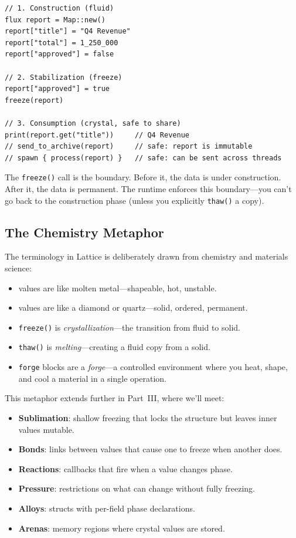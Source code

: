 \begin{lstlisting}[language=Lattice, caption={The lifecycle of data in Lattice}]
// 1. Construction (fluid)
flux report = Map::new()
report["title"] = "Q4 Revenue"
report["total"] = 1_250_000
report["approved"] = false

// 2. Stabilization (freeze)
report["approved"] = true
freeze(report)

// 3. Consumption (crystal, safe to share)
print(report.get("title"))     // Q4 Revenue
// send_to_archive(report)     // safe: report is immutable
// spawn { process(report) }   // safe: can be sent across threads
\end{lstlisting}

The \lstinline|freeze()| call is the boundary.
Before it, the data is under construction.
After it, the data is permanent.
The runtime enforces this boundary---you can't go back to the construction phase (unless you explicitly \lstinline|thaw()| a copy).

\subsection{The Chemistry Metaphor}\label{subsec:chemistry-metaphor}

The terminology in Lattice is deliberately drawn from chemistry and materials science:

\begin{itemize}
  \item {} values are like molten metal---shapeable, hot, unstable.
  \item {} values are like a diamond or quartz---solid, ordered, permanent.
  \item \lstinline|freeze()| is \emph{crystallization}---the transition from fluid to solid.
  \item \lstinline|thaw()| is \emph{melting}---creating a fluid copy from a solid.
  \item \lstinline|forge| blocks are a \emph{forge}---a controlled environment where you heat, shape, and cool a material in a single operation.
\end{itemize}

This metaphor extends further in Part~III, where we'll meet:
\begin{itemize}
  \item \textbf{Sublimation}: shallow freezing that locks the structure but leaves inner values mutable.
  \item \textbf{Bonds}: links between values that cause one to freeze when another does.
  \item \textbf{Reactions}: callbacks that fire when a value changes phase.
  \item \textbf{Pressure}: restrictions on what can change without fully freezing.
  \item \textbf{Alloys}: structs with per-field phase declarations.
  \item \textbf{Arenas}: memory regions where crystal values are stored.
\end{itemize}

